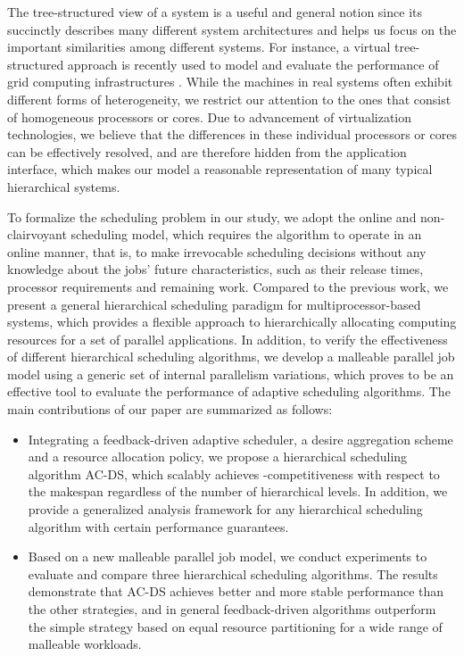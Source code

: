 \documentclass[10pt, a4paper]{article}
\begin{document}
The tree-structured view of a system is a useful and general notion since its succinctly describes
many different system architectures and helps us focus on the important similarities among
different systems. For instance, a virtual tree-structured approach is recently used to model and
evaluate the performance of grid computing infrastructures \cite{DaiLeTr07,LiLi09,HanKiJu09}. While
the machines in real systems often exhibit different forms of heterogeneity, we restrict our
attention to the ones that consist of homogeneous processors or cores. Due to advancement of
virtualization technologies, we believe that the differences in these individual processors or
cores can be effectively resolved, and are therefore hidden from the application interface, which
makes our model a reasonable representation of many typical hierarchical systems.

To formalize the scheduling problem in our study, we adopt the online and non-clairvoyant
scheduling model, which requires the algorithm to operate in an online manner, that is, to make
irrevocable scheduling decisions without any knowledge about the jobs' future characteristics, such
as their release times, processor requirements and remaining work. Compared to the previous work,
we present a general hierarchical scheduling paradigm for multiprocessor-based systems, which
provides a flexible approach to hierarchically allocating computing resources for a set of parallel
applications. In addition, to verify the effectiveness of different hierarchical scheduling
algorithms, we develop a malleable parallel job model using a generic set of internal parallelism
variations, which proves to be an effective tool to evaluate the performance of adaptive scheduling
algorithms. The main contributions of our paper are summarized as follows:
 \begin{itemize}
\item Integrating a feedback-driven adaptive scheduler, a desire aggregation scheme and a resource allocation policy, we propose a hierarchical scheduling algorithm AC-DS, which scalably achieves -competitiveness with respect to the makespan regardless of the number of hierarchical levels. In addition, we provide a generalized analysis framework for any hierarchical scheduling algorithm with certain performance guarantees.
\item Based on a new malleable parallel job model, we conduct experiments to evaluate and compare three hierarchical scheduling algorithms. The results demonstrate that AC-DS achieves better and more stable performance than the other strategies, and in general feedback-driven algorithms outperform the simple strategy based on equal resource partitioning for a wide range of malleable workloads.
 \end{itemize}
\end{document}
